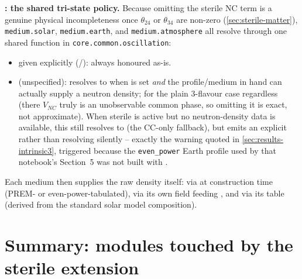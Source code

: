 \begin{notebox}
\textbf{: the shared tri-state policy.}
Because omitting the sterile NC term is a genuine physical incompleteness
once $\theta_{24}$ or $\theta_{34}$ are non-zero (\cref{sec:sterile-matter}),
\texttt{medium.solar}, \texttt{medium.earth}, and \texttt{medium.atmosphere}
all resolve  through one shared function in
\texttt{core.common.oscillation}:
\begin{itemize}
  \item {} given explicitly (/):
    always honoured as-is.
  \item {} (unspecified): resolves to
     when  is set
    \emph{and} the profile/medium in hand can actually supply a neutron
    density;  for the plain 3-flavour case regardless (there
    $V_{NC}$ truly is an unobservable common phase, so omitting it is
    exact, not approximate). When sterile is active but no neutron-density
    data is available, this still resolves to  (the CC-only
    fallback), but emits an explicit  rather than
    resolving silently -- exactly the warning quoted in
    \cref{sec:results-intrinsic3}, triggered because the
    \texttt{even\_power} Earth profile used by that notebook's Section~5
    was not built with .
\end{itemize}
Each medium then supplies the raw density itself: 
via  at
construction time (PREM- or even-power-tabulated), 
via its own  field feeding
, and
 via its  table (derived from
the standard solar model composition).
\end{notebox}

\section{Summary: modules touched by the sterile extension}

